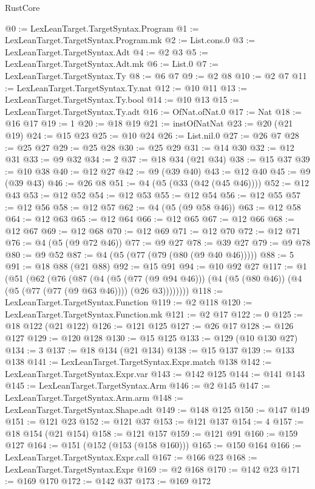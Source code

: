 \begin{lexlean}{RustCore}
\begin{coremodule}
@0 := LexLeanTarget.TargetSyntax.Program
@1 := LexLeanTarget.TargetSyntax.Program.mk
@2 := List.cons.{0}
@3 := LexLeanTarget.TargetSyntax.Adt
@4 := @2 @3
@5 := LexLeanTarget.TargetSyntax.Adt.mk
@6 := List.{0}
@7 := LexLeanTarget.TargetSyntax.Ty
@8 := @6 @7
@9 := @2 @8
@10 := @2 @7
@11 := LexLeanTarget.TargetSyntax.Ty.nat
@12 := @10 @11
@13 := LexLeanTarget.TargetSyntax.Ty.bool
@14 := @10 @13
@15 := LexLeanTarget.TargetSyntax.Ty.adt
@16 := OfNat.ofNat.{0}
@17 := Nat
@18 := @16 @17
@19 := 1
@20 := @18 @19
@21 := instOfNatNat
@23 := @20 (@21 @19)
@24 := @15 @23
@25 := @10 @24
@26 := List.nil.{0}
@27 := @26 @7
@28 := @25 @27
@29 := @25 @28
@30 := @25 @29
@31 := @14 @30
@32 := @12 @31
@33 := @9 @32
@34 := 2
@37 := @18 @34 (@21 @34)
@38 := @15 @37
@39 := @10 @38
@40 := @12 @27
@42 := @9 (@39 @40)
@43 := @12 @40
@45 := @9 (@39 @43)
@46 := @26 @8
@51 := @4 (@5 (@33 (@42 (@45 @46))))
@52 := @12 @43
@53 := @12 @52
@54 := @12 @53
@55 := @12 @54
@56 := @12 @55
@57 := @12 @56
@58 := @12 @57
@62 := @4 (@5 (@9 @58 @46))
@63 := @12 @58
@64 := @12 @63
@65 := @12 @64
@66 := @12 @65
@67 := @12 @66
@68 := @12 @67
@69 := @12 @68
@70 := @12 @69
@71 := @12 @70
@72 := @12 @71
@76 := @4 (@5 (@9 @72 @46))
@77 := @9 @27
@78 := @39 @27
@79 := @9 @78
@80 := @9 @52
@87 := @4 (@5 (@77 (@79 (@80 (@9 @40 @46)))))
@88 := 5
@91 := @18 @88 (@21 @88)
@92 := @15 @91
@94 := @10 @92 @27
@117 := @1
    (@51
      (@62
        (@76
          (@87
            (@4
              (@5 (@77 (@9 @94 @46)))
              (@4 (@5 (@80 @46)) (@4 (@5 (@77 (@77 (@9 @63 @46)))) (@26 @3))))))))
@118 := LexLeanTarget.TargetSyntax.Function
@119 := @2 @118
@120 := LexLeanTarget.TargetSyntax.Function.mk
@121 := @2 @17
@122 := 0
@125 := @18 @122 (@21 @122)
@126 := @121 @125
@127 := @26 @17
@128 := @126 @127
@129 := @120 @128
@130 := @15 @125
@133 := @129 (@10 @130 @27)
@134 := 3
@137 := @18 @134 (@21 @134)
@138 := @15 @137
@139 := @133 @138
@141 := LexLeanTarget.TargetSyntax.Expr.match @138
@142 := LexLeanTarget.TargetSyntax.Expr.var
@143 := @142 @125
@144 := @141 @143
@145 := LexLeanTarget.TargetSyntax.Arm
@146 := @2 @145
@147 := LexLeanTarget.TargetSyntax.Arm.arm
@148 := LexLeanTarget.TargetSyntax.Shape.adt
@149 := @148 @125
@150 := @147 @149
@151 := @121 @23
@152 := @121 @37
@153 := @121 @137
@154 := 4
@157 := @18 @154 (@21 @154)
@158 := @121 @157
@159 := @121 @91
@160 := @159 @127
@164 := @151 (@152 (@153 (@158 @160)))
@165 := @150 @164
@166 := LexLeanTarget.TargetSyntax.Expr.call
@167 := @166 @23
@168 := LexLeanTarget.TargetSyntax.Expr
@169 := @2 @168
@170 := @142 @23
@171 := @169 @170
@172 := @142 @37
@173 := @169 @172

\end{coremodule}
\end{lexlean}
